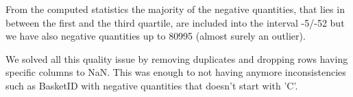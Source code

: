 \documentclass[12pt]{article}
\begin{document}
\begin{table}[h]
    \centering
    \caption{Single description table.}
    \label{tab:singledescr}
\end{table}

From the computed statistics the majority of the negative quantities, that lies in between the first and the third quartile, are included into the interval -5/-52 but we have also negative quantities up to 80995 (almost surely an outlier).

We solved all this quality issue by removing duplicates and dropping rows having specific columns to NaN. This was enough to not having anymore inconsistencies such as BasketID with negative quantities that doesn't start with 'C'.
\end{document}
